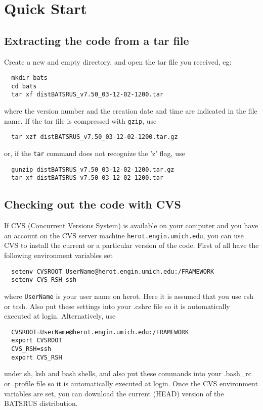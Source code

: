 \section{Quick Start \label{section:quick_start}}

\subsection{Extracting the code from a tar file}

Create a new and empty directory, and open the tar file you received, eg:
\begin{verbatim}
  mkdir bats
  cd bats
  tar xf distBATSRUS_v7.50_03-12-02-1200.tar  
\end{verbatim}
where the version number and the creation date and time are indicated
in the file name. If the tar file is compressed with {\tt gzip}, use
\begin{verbatim}
  tar xzf distBATSRUS_v7.50_03-12-02-1200.tar.gz
\end{verbatim}
or, if the {\tt tar} command does not recognize the 'z' flag, use
\begin{verbatim}
  gunzip distBATSRUS_v7.50_03-12-02-1200.tar.gz
  tar xf distBATSRUS_v7.50_03-12-02-1200.tar
\end{verbatim}

\subsection{Checking out the code with CVS}

If CVS (Concurrent Versions System) is available on your computer
and you have an account on the CVS server machine 
{\tt herot.engin.umich.edu}, you can use CVS to install
the current or a particular version of the code.
First of all have the following environment variables set
\begin{verbatim}
  setenv CVSROOT UserName@herot.engin.umich.edu:/FRAMEWORK
  setenv CVS_RSH ssh
\end{verbatim}
where {\tt UserName} is your user name on herot. Here it is assumed
that you use csh or tcsh. Also put these settings into your .cshrc file
so it is automatically executed at login. Alternatively, use
\begin{verbatim}
  CVSROOT=UserName@herot.engin.umich.edu:/FRAMEWORK
  export CVSROOT
  CVS_RSH=ssh
  export CVS_RSH
\end{verbatim}
under sh, ksh and bash shells, and also put these commands into your 
.bash\_rc or .profile file so it is automatically executed at login.
Once the CVS environment variables are set, you can download the
current (HEAD) version of the BATSRUS distribution.

